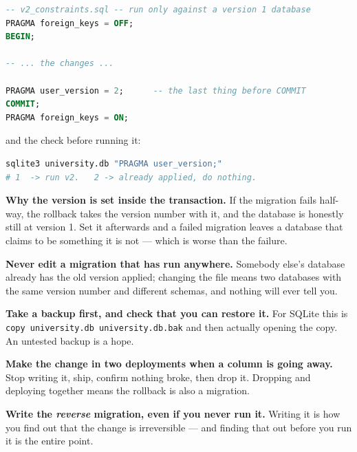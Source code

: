 \begin{examplebox}
\begin{lstlisting}[language=sql]
-- v2_constraints.sql -- run only against a version 1 database
PRAGMA foreign_keys = OFF;
BEGIN;

-- ... the changes ...

PRAGMA user_version = 2;      -- the last thing before COMMIT
COMMIT;
PRAGMA foreign_keys = ON;
\end{lstlisting}

and the check before running it:
\begin{lstlisting}[language=bash]
sqlite3 university.db "PRAGMA user_version;"
# 1  -> run v2.   2 -> already applied, do nothing.
\end{lstlisting}

\smallskip
\textbf{Why the version is set inside the transaction.} If the migration
fails half-way, the rollback takes the version number with it, and the
database is honestly still at version 1. Set it afterwards and a failed
migration leaves a database that claims to be something it is not --- which is
worse than the failure.
\end{examplebox}

\begin{alertbox}
\begin{tight}
  \item \textbf{Never edit a migration that has run anywhere.} Somebody else's
        database already has the old version applied; changing the file means
        two databases with the same version number and different schemas, and
        nothing will ever tell you.
  \item \textbf{Take a backup first, and check that you can restore it.} For
        SQLite this is \texttt{copy university.db university.db.bak} and then
        actually opening the copy. An untested backup is a hope.
  \item \textbf{Make the change in two deployments when a column is going
        away.} Stop writing it, ship, confirm nothing broke, then drop it.
        Dropping and deploying together means the rollback is also a
        migration.
  \item \textbf{Write the \emph{reverse} migration, even if you never run
        it.} Writing it is how you find out that the change is irreversible
        --- and finding that out before you run it is the entire point.
  \end{tight}
\end{alertbox}

